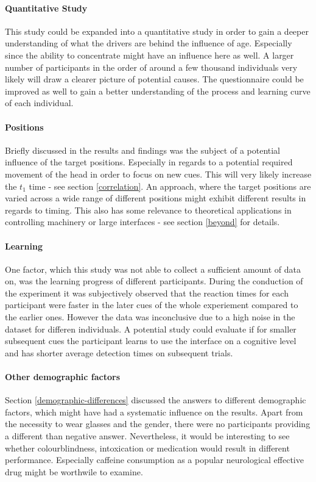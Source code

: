             \paragraph{Quantitative Study} This study could be expanded into a quantitative study in order to gain a deeper understanding of what the drivers are behind the influence of age. Especially since the ability to concentrate might have an influence here as well. A larger number of participants in the order of around a few thousand individuals very likely will draw a clearer picture of potential causes. The questionnaire could be improved as well to gain a better understanding of the process and learning curve of each individual. 

            \paragraph{Positions} Briefly discussed in the results and findings was the subject of a potential influence of the target positions. Especially in regards to a potential required movement of the head in order to focus on new cues. This will very likely increase the $t_{1}$ time - see section \ref*{correlation}. An approach, where the target positions are varied across a wide range of different positions might exhibit different results in regards to timing. This also has some relevance to theoretical applications in controlling machinery or large interfaces - see section \ref*{beyond} for details.

            \paragraph{Learning} One factor, which this study was not able to collect a sufficient amount of data on, was the learning progress of different participants. During the conduction of the experiment it was subjectively observed that the reaction times for each participant were faster in the later cues of the whole experiement compared to the earlier ones. However the data was inconclusive due to a high noise in the dataset for differen individuals. A potential study could evaluate if for smaller subsequent cues the participant learns to use the interface on a cognitive level and has shorter average detection times on subsequent trials.

            \paragraph{Other demographic factors} Section \ref*{demographic-differences} discussed the answers to different demographic factors, which might have had a systematic influence on the results. Apart from the necessity to wear glasses and the gender, there were no participants providing a different than negative answer. Nevertheless, it would be interesting to see whether colourblindness, intoxication or medication would result in different performance. Especially caffeine consumption as a popular neurological effective drug might be worthwile to examine. 

